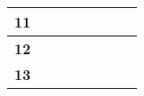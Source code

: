 \begin{table}[ht]
\begin{tabular}{|l|l|llll|l|l|}
    \textbf{11}                                                                 &                                                                                              & \multicolumn{1}{l|}{}                                   & \multicolumn{1}{l|}{}                                   & \multicolumn{1}{l|}{}                                   &                                                         &                                                                                                  &                                                                                                    \\ \hline
    \textbf{12}                                                                 &                                                                                              & \multicolumn{1}{l|}{}                                   & \multicolumn{1}{l|}{}                                   & \multicolumn{1}{l|}{}                                   &                                                         &                                                                                                  &                                                                                                    \\ \hline
    \textbf{13}                                                                 &                                                                                              & \multicolumn{1}{l|}{}                                   & \multicolumn{1}{l|}{}                                   & \multicolumn{1}{l|}{}                                   &                                                         &                                                                                                  &                                                                                                    \\ \hline
    \end{tabular}
    \end{table}